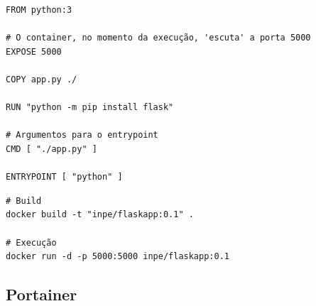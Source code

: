 \documentclass[]{article}
\begin{document}
\begin{verbatim}
FROM python:3

# O container, no momento da execução, 'escuta' a porta 5000
EXPOSE 5000

COPY app.py ./

RUN "python -m pip install flask"

# Argumentos para o entrypoint
CMD [ "./app.py" ]

ENTRYPOINT [ "python" ]
\end{verbatim}

\begin{verbatim}
# Build
docker build -t "inpe/flaskapp:0.1" .

# Execução
docker run -d -p 5000:5000 inpe/flaskapp:0.1
\end{verbatim}

\hypertarget{portainer}{%
\subsection{Portainer}\label{portainer}}
\end{document}
